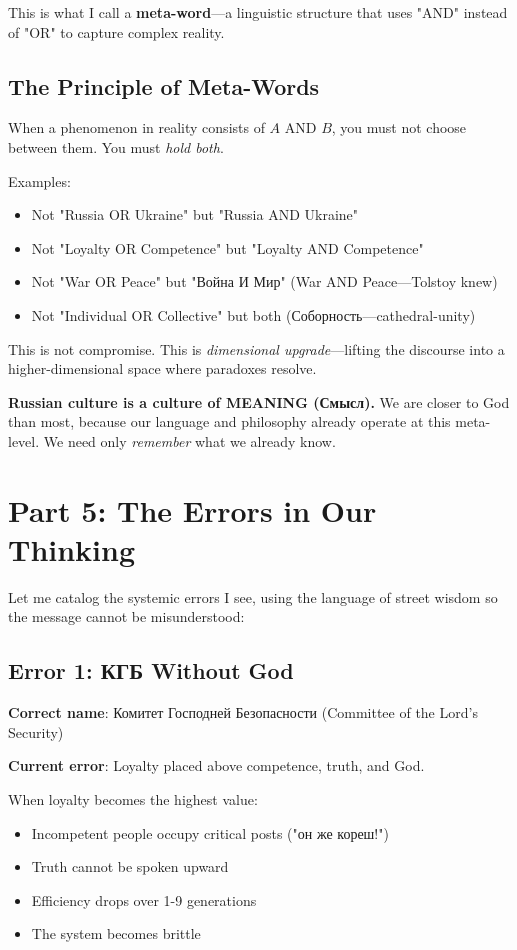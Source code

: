 \documentclass[12pt,a4paper]{article}
\begin{document}
This is what I call a \textbf{meta-word}—a linguistic structure that uses "AND" instead of "OR" to capture complex reality.

\subsection{The Principle of Meta-Words}

When a phenomenon in reality consists of $A$ AND $B$, you must not choose between them. You must \textit{hold both}.

Examples:
\begin{itemize}
\item Not "Russia OR Ukraine" but "Russia AND Ukraine"
\item Not "Loyalty OR Competence" but "Loyalty AND Competence"
\item Not "War OR Peace" but "Война И Мир" (War AND Peace—Tolstoy knew)
\item Not "Individual OR Collective" but both (Соборность—cathedral-unity)
\end{itemize}

This is not compromise. This is \textit{dimensional upgrade}—lifting the discourse into a higher-dimensional space where paradoxes resolve.

\textbf{Russian culture is a culture of MEANING (Смысл).} We are closer to God than most, because our language and philosophy already operate at this meta-level. We need only \textit{remember} what we already know.

\section{Part 5: The Errors in Our Thinking}

Let me catalog the systemic errors I see, using the language of street wisdom so the message cannot be misunderstood:

\subsection{Error 1: КГБ Without God}

\textbf{Correct name}: Комитет Господней Безопасности (Committee of the Lord's Security)

\textbf{Current error}: Loyalty placed above competence, truth, and God.

When loyalty becomes the highest value:
\begin{itemize}
\item Incompetent people occupy critical posts ("он же кореш!")
\item Truth cannot be spoken upward
\item Efficiency drops over 1-9 generations
\item The system becomes brittle
\end{itemize}
\end{document}
